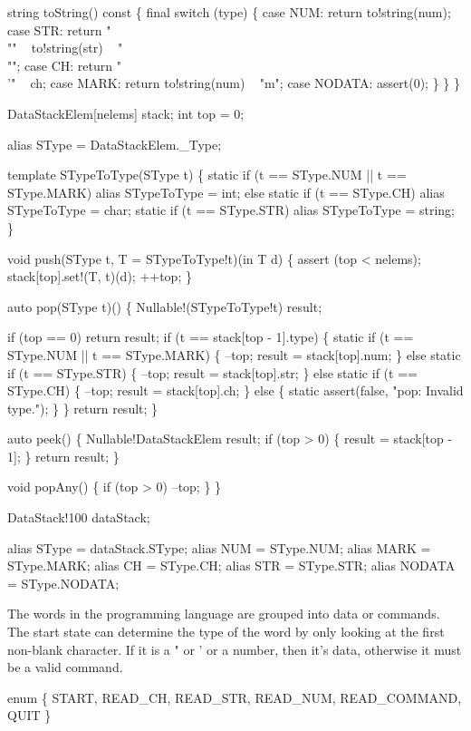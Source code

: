     string toString() const \{
      final switch (type) \{
      case NUM:    return to!string(num);
      case STR:    return "\\"" ~ to!string(str) ~ "\\"";
      case CH:     return "\\'" ~ ch;
      case MARK:   return to!string(num) ~ "m";
      case NODATA: assert(0);
      \}
    \}
  \}

  DataStackElem[nelems] stack;
  int top = 0;

  alias SType = DataStackElem._Type;

  template STypeToType(SType t) \{
    static if (t == SType.NUM || t == SType.MARK)
      alias STypeToType = int;
    else static if (t == SType.CH)
      alias STypeToType = char;
    static if (t == SType.STR)
      alias STypeToType = string;
  \}

  void push(SType t, T = STypeToType!t)(in T d)
  \{
    assert (top < nelems);
    stack[top].set!(T, t)(d);
    ++top;
  \}

  auto pop(SType t)()
  \{
    Nullable!(STypeToType!t) result;

    if (top == 0) return result;
    if (t == stack[top - 1].type) \{
      static if (t == SType.NUM ||
                 t == SType.MARK) \{
        --top;
        result = stack[top].num;
      \} else static if (t == SType.STR) \{
        --top;
        result = stack[top].str;
      \} else static if (t == SType.CH) \{
        --top;
        result = stack[top].ch;
      \} else \{
        static assert(false, "pop: Invalid type.");
      \}
    \}
    return result;
  \}

  auto peek()
  \{
    Nullable!DataStackElem result;
    if (top > 0) \{
      result = stack[top - 1];
    \}
    return result;
  \}

  void popAny()
  \{
    if (top > 0) --top;
  \}
\}

DataStack!100 dataStack;

alias SType  = dataStack.SType;
alias NUM    = SType.NUM;
alias MARK   = SType.MARK;
alias CH     = SType.CH;
alias STR    = SType.STR;
alias NODATA = SType.NODATA;

\nwendcode{}The words in the programming language are grouped into data or
commands. The start state can determine the type of the word by only
looking at the first non-blank character. If it is a " or ' or a
number, then it's data, otherwise it must be a valid command.

\nwenddocs{}\endmoddef\nwstartdeflinemarkup\nwenddeflinemarkup
enum \{
  START,
  READ_CH,
  READ_STR,
  READ_NUM,
  READ_COMMAND,
  QUIT
\}

